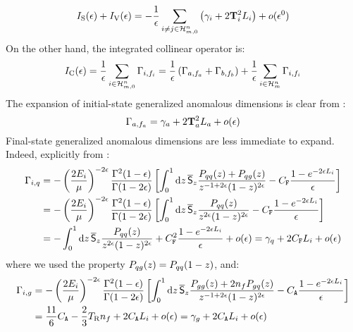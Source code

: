 \begin{equation}
  I_\text{S}(\epsilon) + I_\text{V}(\epsilon) = - \frac{1}{\epsilon} \sum_{i \neq j \in \mathcal{H}^{n}_{m,0}} \left( \gamma_i + 2 \mathbf{T}_i^2 L_i \right) + o(\epsilon^0)
\end{equation}
On the other hand, the integrated collinear operator is:
\begin{equation*}
  I_\text{C}(\epsilon) = \frac{1}{\epsilon} \sum_{i \in \mathcal{H}^{n}_{m,0}} \Gamma_{i , f_i} = \frac{1}{\epsilon} \left( \Gamma_{a , f_a} + \Gamma_{b , f_b} \right) + \frac{1}{\epsilon} \sum_{i \in \mathcal{H}^{n}_{m}} \Gamma_{i , f_i}
\end{equation*}
The expansion of initial-state generalized anomalous dimensions is clear from :
\begin{equation}
  \Gamma_{a , f_a} = \gamma_a + 2 \mathbf{T}_a^2 L_a + o(\epsilon)
  \label{eq:gen-ad}
\end{equation}
Final-state generalized anomalous dimensions are less immediate to expand. Indeed, explicitly from :
\begin{equation*}
  \begin{split}
    \Gamma_{i , q}
    & = - \left( \frac{2E_i}{\mu} \right)^{-2\epsilon} \frac{\Gamma^2(1-\epsilon)}{\Gamma(1-2\epsilon)} \left[ \int_0^1 \mathrm{d} z\, \overline{\mathsf{S}}_z \frac{P_{qq}(z) + P_{qg}(z)}{z^{-1 + 2\epsilon} (1-z)^{2\epsilon}} - C_\mathtt{F} \frac{1 - e^{-2\epsilon L_i}}{\epsilon} \right] \\
    & = - \left( \frac{2E_i}{\mu} \right)^{-2\epsilon} \frac{\Gamma^2(1-\epsilon)}{\Gamma(1-2\epsilon)} \left[ \int_0^1 \mathrm{d} z\, \overline{\mathsf{S}}_z \frac{P_{qq}(z)}{z^{2\epsilon} (1-z)^{2\epsilon}} - C_\mathtt{F} \frac{1 - e^{-2\epsilon L_i}}{\epsilon} \right] \\
    & = - \int_0^1 \mathrm{d} z\, \overline{\mathsf{S}}_z \frac{P_{qq}(z)}{z^{2\epsilon} (1-z)^{2\epsilon}} + C_\mathtt{F}^2 \frac{1 - e^{-2\epsilon L_i}}{\epsilon} + o(\epsilon) = \gamma_q + 2 C_\mathtt{F} L_i + o(\epsilon)
  \end{split}
\end{equation*}
where we used the property $ P_{qg}(z) = P_{qq}(1 - z) $, and:
\begin{equation*}
  \begin{split}
    \Gamma_{i , g}
    & = - \left( \frac{2E_i}{\mu} \right)^{-2\epsilon} \frac{\Gamma^2(1-\epsilon)}{\Gamma(1-2\epsilon)} \left[ \int_0^1 \mathrm{d} z\, \overline{\mathsf{S}}_z \frac{P_{gg}(z) + 2n_f P_{gq}(z)}{z^{-1+2\epsilon}(1-z)^{2\epsilon}} - C_\mathtt{A} \frac{1 - e^{-2\epsilon L_i}}{\epsilon} \right] \\
    & = \frac{11}{6} C_\mathtt{A} - \frac{2}{3} T_\text{R} n_f + 2 C_\mathtt{A} L_i + o(\epsilon) = \gamma_g + 2 C_\mathtt{A} L_i + o(\epsilon)
  \end{split}
\end{equation*}
